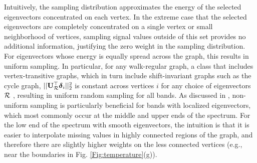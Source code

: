 \documentclass[journal, 10pt]{IEEEtran}
\begin{document}
Intuitively, the sampling distribution approximates the energy of the selected eigenvectors concentrated on each vertex. In the extreme case that the selected eigenvectors are completely concentrated on a single vertex or small neighborhood of vertices, sampling signal values outside of this set provides no additional information, justifying the zero weight in the sampling distribution. For eigenvectors whose energy is equally spread across the graph, this results in uniform sampling. In particular, for any walk-regular graph, a class that includes vertex-transitive graphs, which in turn include shift-invariant graphs such as the cycle graph, $||{\bf U}_{{\cal R}}^{\top} {\boldsymbol \delta}_i ||_2^2$ is constant across vertices $i$ for any choice of eigenvectors ${\cal R}$ \cite[Corollary 3.2]{chan1997symmetry}, resulting in uniform random sampling for all bands. %
As discussed in \cite[Section 5.1.2]{PuyTGV15}, non-uniform sampling is particularly beneficial for bands with localized eigenvectors, %
 which most commonly occur at the middle and upper ends of the spectrum. %
 For the low end of the spectrum with smooth eigenvectors, the intuition is that it is easier to interpolate missing values in highly connected regions of the graph, and therefore there are slightly higher weights on the less connected vertices (e.g., near the boundaries in Fig. \ref{Fig:temperature}(g)).
%
\end{document}
